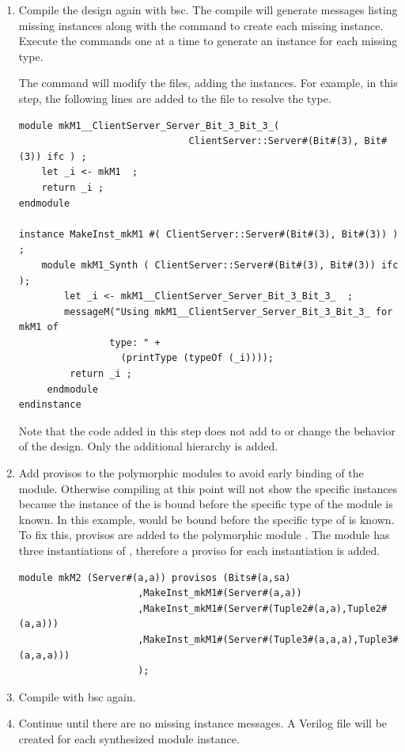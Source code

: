 \begin{enumerate}
 \item Compile the design again with bsc.   The compile will generate messages
listing missing instances along with the  command to
 create each missing instance.   Execute the commands 
one at a time to generate an instance for each missing type. 

The  command will modify the  files,
adding the instances.  For example, in this step, the following lines
are added to the  file to resolve the
 type.  

\begin{verbatim}
module mkM1__ClientServer_Server_Bit_3_Bit_3_(
                              ClientServer::Server#(Bit#(3), Bit#(3)) ifc ) ;
    let _i <- mkM1  ;
    return _i ;
endmodule

instance MakeInst_mkM1 #( ClientServer::Server#(Bit#(3), Bit#(3)) ) ;
    module mkM1_Synth ( ClientServer::Server#(Bit#(3), Bit#(3)) ifc );
        let _i <- mkM1__ClientServer_Server_Bit_3_Bit_3_  ;
        messageM("Using mkM1__ClientServer_Server_Bit_3_Bit_3_ for mkM1 of
                type: " +
                  (printType (typeOf (_i))));
         return _i ;
     endmodule
endinstance
\end{verbatim}

Note that the code added in this step does not add to or change the
behavior of the design.  Only the additional hierarchy is added.

\item Add provisos to the polymorphic modules to avoid early binding
of the module.  Otherwise compiling at this point will not show the
specific instances because the instance of the  is bound
before the specific type of the module is known. In this example,
 would be  bound
before  the specific type of  is known.  To fix this,  
provisos  are added to the
polymorphic module .  The module  has three
instantiations of , therefore a proviso for each
instantiation is  added.

\begin{verbatim}
module mkM2 (Server#(a,a)) provisos (Bits#(a,sa) 
                     ,MakeInst_mkM1#(Server#(a,a))
                     ,MakeInst_mkM1#(Server#(Tuple2#(a,a),Tuple2#(a,a)))
                     ,MakeInst_mkM1#(Server#(Tuple3#(a,a,a),Tuple3#(a,a,a)))
                     );

\end{verbatim} 

\item Compile with bsc again. 

\item Continue  until there are no missing instance messages.   A
Verilog file will be created for each synthesized module instance.

\end{enumerate}


